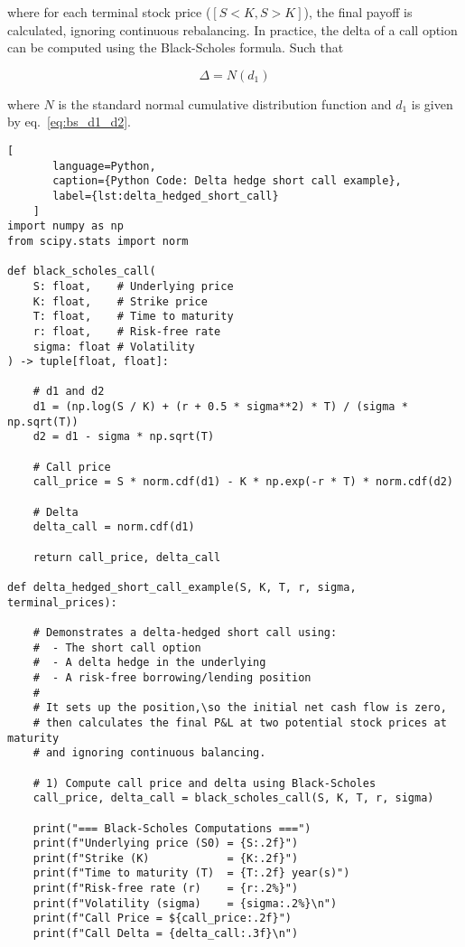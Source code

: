     where for each terminal stock price ($[S < K ,S > K]$), the final payoff is calculated,
    ignoring continuous rebalancing.
    In practice, the delta of a call option can be computed using the Black-Scholes formula. Such that

    \begin{equation}
        \Delta = N(d_1)
        \label{eq:delta_bs}
    \end{equation}

    where $N$ is the standard normal cumulative distribution function and $d_1$ is given by eq.~\ref{eq:bs_d1_d2}.

    \begin{lstlisting}[
       language=Python,
       caption={Python Code: Delta hedge short call example},
       label={lst:delta_hedged_short_call}
    ]
import numpy as np
from scipy.stats import norm

def black_scholes_call(
    S: float,    # Underlying price
    K: float,    # Strike price
    T: float,    # Time to maturity
    r: float,    # Risk-free rate
    sigma: float # Volatility
) -> tuple[float, float]:

    # d1 and d2
    d1 = (np.log(S / K) + (r + 0.5 * sigma**2) * T) / (sigma * np.sqrt(T))
    d2 = d1 - sigma * np.sqrt(T)

    # Call price
    call_price = S * norm.cdf(d1) - K * np.exp(-r * T) * norm.cdf(d2)

    # Delta
    delta_call = norm.cdf(d1)

    return call_price, delta_call

def delta_hedged_short_call_example(S, K, T, r, sigma, terminal_prices):

    # Demonstrates a delta-hedged short call using:
    #  - The short call option
    #  - A delta hedge in the underlying
    #  - A risk-free borrowing/lending position
    #
    # It sets up the position,\so the initial net cash flow is zero,
    # then calculates the final P&L at two potential stock prices at maturity
    # and ignoring continuous balancing.

    # 1) Compute call price and delta using Black-Scholes
    call_price, delta_call = black_scholes_call(S, K, T, r, sigma)

    print("=== Black-Scholes Computations ===")
    print(f"Underlying price (S0) = {S:.2f}")
    print(f"Strike (K)            = {K:.2f}")
    print(f"Time to maturity (T)  = {T:.2f} year(s)")
    print(f"Risk-free rate (r)    = {r:.2%}")
    print(f"Volatility (sigma)    = {sigma:.2%}\n")
    print(f"Call Price = ${call_price:.2f}")
    print(f"Call Delta = {delta_call:.3f}\n")


\end{lstlisting}

